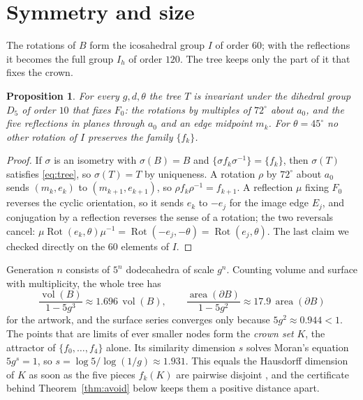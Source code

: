 \documentclass[12pt]{article}
\theoremstyle{plain}
\newtheorem{proposition}[theorem]{Proposition}
\theoremstyle{remark}
\newcommand{\Rot}{\operatorname{Rot}}
\newcommand{\vol}{\operatorname{vol}}
\begin{document}
\section{Symmetry and size}

The rotations of $B$ form the icosahedral group $I$ of order $60$; with the
reflections it becomes the full group $I_h$ of order $120$.  The tree keeps
only the part of it that fixes the crown.

\begin{proposition}\label{prop:sym}
For every $g,d,\theta$ the tree $T$ is invariant under the dihedral group
$D_5$ of order $10$ that fixes $F_0$: the rotations by multiples of $72^\circ$
about $a_0$, and the five reflections in planes through $a_0$ and an edge
midpoint $m_k$.  For $\theta=45^\circ$ no other rotation of $I$ preserves the
family $\{f_k\}$.
\end{proposition}

\begin{proof}
If $\sigma$ is an isometry with $\sigma(B)=B$ and $\{\sigma f_k\sigma^{-1}\}=\{f_k\}$,
then $\sigma(T)$ satisfies \eqref{eq:tree}, so $\sigma(T)=T$ by uniqueness.  A
rotation $\rho$ by $72^\circ$ about $a_0$ sends $(m_k,e_k)$ to
$(m_{k+1},e_{k+1})$, so $\rho f_k\rho^{-1}=f_{k+1}$.  A reflection $\mu$
fixing $F_0$ reverses the cyclic orientation, so it sends $e_k$ to $-e_{j}$
for the image edge $E_j$, and conjugation by a reflection reverses the sense
of a rotation; the two reversals cancel:
$\mu\Rot(e_k,\theta)\mu^{-1}=\Rot(-e_j,-\theta)=\Rot(e_j,\theta)$.  The last
claim we checked directly on the $60$ elements of $I$.
\end{proof}

Generation $n$ consists of $5^n$ dodecahedra of scale $g^n$.  Counting
volume and surface with multiplicity, the whole tree has
\[
  \frac{\vol(B)}{1-5g^3}\approx1.696\,\vol(B),\qquad
  \frac{\operatorname{area}(\partial B)}{1-5g^2}\approx 17.9\,\operatorname{area}(\partial B)
\]
for the artwork, and the surface series converges only because
$5g^2\approx0.944<1$.  The points that are limits of ever smaller nodes form
the \emph{crown set} $K$, the attractor of $\{f_0,\dots,f_4\}$ alone.  Its
similarity dimension $s$ solves Moran's equation $5g^s=1$, so
$s=\log5/\log(1/g)\approx1.931$.  This equals the Hausdorff dimension of $K$
as soon as the five pieces $f_k(K)$ are pairwise disjoint
\cite{Moran1946,Hutchinson1981,Falconer2014}, and the certificate behind
Theorem~\ref{thm:avoid} below keeps them a positive distance apart.
\end{document}
